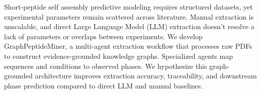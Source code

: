 
Short-peptide self assembly predictive modeling requires structured datasets, yet experimental parameters remain scattered across literature. Manual extraction is unscalable, and direct Large Language Model (LLM) extraction doesn't resolve a lack of parameters or overlaps between experiments. We develop GraphPeptideMiner, a multi-agent extraction workflow that processes raw PDFs to construct evidence-grounded knowledge graphs. Specialized agents map sequences and conditions to observed phases. We hypothesize this graph-grounded architecture improves extraction accuracy, traceability, and downstream phase prediction compared to direct LLM and manual baselines.  